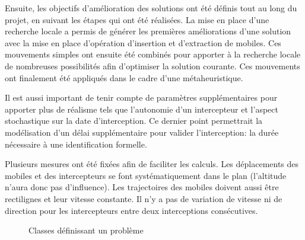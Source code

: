 		Ensuite, les objectifs d'amélioration des solutions ont été définis tout au long du projet, en suivant les étapes qui ont été réalisées. La mise en place d'une recherche locale a permis de générer les premières améliorations d'une solution avec la mise en place d'opération d'insertion et d'extraction de mobiles. Ces mouvements simples ont ensuite été combinés pour apporter à la recherche locale de nombreuses possibilités afin d'optimiser la solution courante. Ces mouvements ont finalement été appliqués dans le cadre d'une métaheuristique.
		
		Il est aussi important de tenir compte de paramètres supplémentaires pour apporter plus de réalisme tels que l'autonomie d'un intercepteur et l'aspect stochastique sur la date d'interception. Ce dernier point permettrait la modélisation d'un délai supplémentaire pour valider l'interception: la durée nécessaire à une identification formelle.
		
		
		Plusieurs mesures ont été fixées afin de faciliter les calculs. Les déplacements des mobiles et des intercepteurs se font systématiquement dans le plan (l'altitude n'aura donc pas d'influence). Les trajectoires des mobiles doivent aussi être rectilignes et leur vitesse constante. Il n'y a pas de variation de vitesse ni de direction pour les intercepteurs entre deux interceptions consécutives.

		\begin{figure}[h!]
			\centering
			\begin{tikzpicture}
				
			\end{tikzpicture}
			\caption{Classes définissant un problème}
			\label{fig:problem-uml}
		\end{figure}
		



